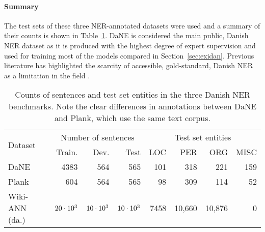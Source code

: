 \documentclass[main.tex]{subfiles}
\begin{document}
\paragraph{Summary}
The test sets of these three NER-annotated datasets were used and a summary of their counts is shown in Table~\ref{tab:daNERdata}.
DaNE is considered the main public, Danish NER dataset as it is produced with the highest degree of expert supervision and used for training most of the models compared in Section~\ref{sec:exidan}.
Previous literature has highlighted the scarcity of accessible, gold-standard, Danish NER as a limitation in the field \cite[Sec. 2.1]{plank2019neural}.
\begin{table}[H]
    \centering
    \begin{tabular}{l|rrr|rrrr}
        \multirow{2}{*}{Dataset} & \multicolumn{3}{c|}{Number of sentences} & \multicolumn{4}{c}{Test set entities}\\
                                &Train. & Dev. & Test &LOC & PER & ORG & MISC \\\hline
        DaNE        & 4383 & 564 & 565 & 101 & 318 & 221 & 159 \\
        Plank       & 604  & 564 & 565 & 98  & 309 & 114 & 52 \\
        Wiki-ANN (da.)   & $20\cdot10^{3}$ & $10\cdot10^{3}$ & $10\cdot10^{3}$ & 7458 & 10,660 & 10,876 & 0
    \end{tabular}
    \caption{
        Counts of sentences and test set entities in the three Danish NER benchmarks.
        Note the clear differences in annotations between DaNE and Plank, which use the same text corpus.
    }
    \label{tab:daNERdata}
\end{table}
\end{document}
